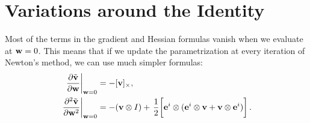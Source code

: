 \documentclass[10pt]{article}
\providecommand{\cross}{\times}
\providecommand{\pder}[2]{\frac{\partial #1}{\partial #2}}
\renewcommand{\vec}[1]{{\bf #1}}
\def\w{\vec{w}}
\def\v{\vec{v}}
\def\e{\vec{e}}
\begin{document}
\section{Variations around the Identity}
\label{sec:around_identity}
Most of the terms in the gradient and Hessian formulas vanish when we evaluate at $\w = 0$. This means that if we update the
parametrization at every iteration of Newton's method, we can use much simpler formulas:
\begin{align*}
\left.\pder{\tilde{\v}}{\w}\right|_{\w = 0} &=
     - [\v]_\cross,
\\
\left.\frac{\partial^2 \tilde{\v}}{\partial \w^2}\right|_{\w = 0} &=
-(\v \otimes I)
+ \left.\frac{1}{2} \middle[ \e^i \otimes (\e^i \otimes \v +  \v \otimes \e^i) \right].
\end{align*}



\end{document}

